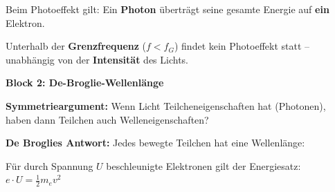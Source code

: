 \documentclass[11pt,a4paper]{article}
\newcommand{\lsg}[1]{\textcolor{loesung}{\textbf{#1}}}
\begin{document}

\begin{tcolorbox}[merkbox={Kasten 1: Merksatz Photoeffekt}]
Beim Photoeffekt gilt: Ein \lsg{Photon} überträgt seine gesamte Energie auf \lsg{ein} Elektron.

\vspace{0.3em}
Unterhalb der \lsg{Grenzfrequenz} ($f < f_G$) findet kein Photoeffekt statt -- unabhängig von der \lsg{Intensität} des Lichts.
\end{tcolorbox}

\newpage


{\large\textbf{Block 2: De-Broglie-Wellenlänge}}

\vspace{0.3em}


\begin{tcolorbox}[merkbox={Kasten 2: De-Broglie-Hypothese (1924)}]
\textbf{Symmetrieargument:} Wenn Licht Teilcheneigenschaften hat (Photonen), haben dann Teilchen auch Welleneigenschaften?

\vspace{0.5em}
\textbf{De Broglies Antwort:} Jedes bewegte Teilchen hat eine Wellenlänge:

\begin{center}
\end{center}

\vspace{0.3em}
Für durch Spannung $U$ beschleunigte Elektronen gilt der Energiesatz: $e \cdot U = \frac{1}{2} m_e v^2$
\end{tcolorbox}

\vspace{0.5em}

\end{document}
